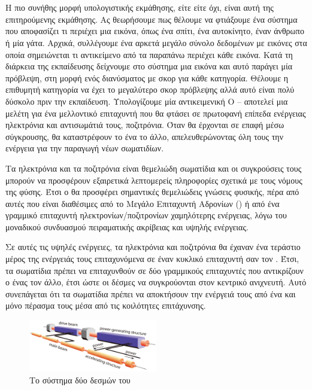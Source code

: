 \section{ }

Η πιο συνήθης μορφή υπολογιστικής εκμάθησης, είτε  είτε όχι, είναι αυτή της επιτηρούμενης εκμάθησης. Ας θεωρήσουμε πως θέλουμε να φτιάξουμε ένα σύστημα που αποφασίζει τι περιέχει μια εικόνα, όπως ένα σπίτι, ένα αυτοκίνητο, έναν άνθρωπο ή μία γάτα. Αρχικά, συλλέγουμε ένα αρκετά μεγάλο σύνολο δεδομένων με εικόνες στα οποία σημειώνεται τι αντικείμενο από τα παραπάνω περιέχει κάθε εικόνα. Κατά τη διάρκεια της εκπαίδευσης δείχνουμε στο σύστημα μια εικόνα και αυτό παράγει μία πρόβλεψη, στη μορφή ενός διανύσματος με σκορ για κάθε κατηγορία. Θέλουμε η επιθυμητή κατηγορία να έχει το μεγαλύτερο σκορ πρόβλεψης αλλά αυτό είναι πολύ δύσκολο πριν την εκπαίδευση. Υπολογίζουμε μία αντικειμενική %
Ο  -- αποτελεί μια μελέτη για ένα μελλοντικό επιταχυντή που θα φτάσει σε πρωτοφανή επίπεδα ενέργειας ηλεκτρόνια και αντισωμάτιά τους, ποζιτρόνια. 
Όταν θα έρχονται σε επαφή μέσω σύγκρουσης, θα καταστρέφουν το ένα το άλλο, απελευθερώνοντας όλη τους την ενέργεια για την παραγωγή νέων σωματιδίων.

Τα ηλεκτρόνια και τα ποζιτρόνια είναι θεμελιώδη σωματίδια και οι συγκρούσεις τους μπορούν να προσφέρουν εξαιρετικά λεπτομερείς πληροφορίες σχετικά με τους νόμους της φύσης. 
Έτσι ο  θα προσφέρει σημαντικές θεμελιώδεις γνώσεις φυσικής, πέρα από αυτές που είναι διαθέσιμες από το Μεγάλο Επιταχυντή Αδρονίων () ή από ένα γραμμικό επιταχυντή ηλεκτρονίων/ποζιτρονίων χαμηλότερης ενέργειας, λόγω του μοναδικού συνδυασμού πειραματικής ακρίβειας και υψηλής ενέργειας.

Σε αυτές τις υψηλές ενέργειες, τα ηλεκτρόνια και ποζιτρόνια θα έχαναν ένα τεράστιο μέρος της ενέργειάς τους επιταχυνόμενα σε έναν κυκλικό επιταχυντή σαν τον . 
Έτσι, τα σωματίδια πρέπει να επιταχυνθούν σε δύο γραμμικούς επιταχυντές που αντικρίζουν ο ένας τον άλλο, έτσι ώστε οι δέσμες να συγκρούονται στον κεντρικό ανιχνευτή. 
Αυτό συνεπάγεται ότι τα σωματίδια πρέπει να αποκτήσουν την ενέργειά τους από ένα και μόνο πέρασμα τους μέσα από τις κοιλότητες επιτάχυνσης.

\begin{figure}[h]
\includegraphics[width=0.5\textwidth]{images/CLIC-twobeam.jpg}
\centering
\caption{Το σύστημα δύο δεσμών του }
\label{CLICtwobeamscheme}
\end{figure}

